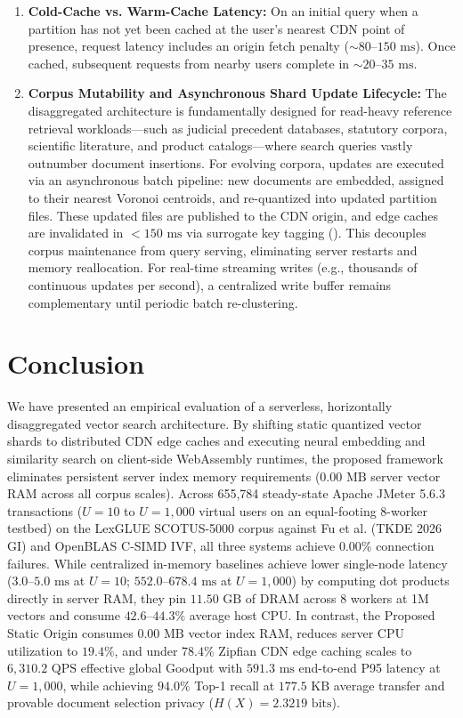 \documentclass[11pt,journal,compsoc,onecolumn]{IEEEtran}
\begin{document}
\begin{enumerate}
    \item \textbf{Cold-Cache vs. Warm-Cache Latency:} On an initial query when a partition has not yet been cached at the user's nearest CDN point of presence, request latency includes an origin fetch penalty ($\sim 80\text{--}150\text{ ms}$). Once cached, subsequent requests from nearby users complete in $\sim 20\text{--}35\text{ ms}$.
    \item \textbf{Corpus Mutability and Asynchronous Shard Update Lifecycle:} The disaggregated architecture is fundamentally designed for read-heavy reference retrieval workloads---such as judicial precedent databases, statutory corpora, scientific literature, and product catalogs---where search queries vastly outnumber document insertions. For evolving corpora, updates are executed via an asynchronous batch pipeline: new documents are embedded, assigned to their nearest Voronoi centroids, and re-quantized into updated partition files. These updated files are published to the CDN origin, and edge caches are invalidated in $<150\text{ ms}$ via surrogate key tagging (). This decouples corpus maintenance from query serving, eliminating server restarts and memory reallocation. For real-time streaming writes (e.g., thousands of continuous updates per second), a centralized write buffer remains complementary until periodic batch re-clustering.
\end{enumerate}

\clearpage

\section{Conclusion}
We have presented an empirical evaluation of a serverless, horizontally disaggregated vector search architecture. By shifting static quantized vector shards to distributed CDN edge caches and executing neural embedding and similarity search on client-side WebAssembly runtimes, the proposed framework eliminates persistent server index memory requirements ($0.00\text{ MB}$ server vector RAM across all corpus scales). Across 655,784 steady-state Apache JMeter 5.6.3 transactions ($U=10$ to $U=1,000$ virtual users on an equal-footing 8-worker testbed) on the LexGLUE SCOTUS-5000 corpus against Fu et al. (TKDE 2026 GI) and OpenBLAS C-SIMD IVF, all three systems achieve $0.00\%$ connection failures. While centralized in-memory baselines achieve lower single-node latency ($3.0\text{--}5.0\text{ ms}$ at $U=10$; $552.0\text{--}678.4\text{ ms}$ at $U=1,000$) by computing dot products directly in server RAM, they pin $11.50\text{ GB}$ of DRAM across 8 workers at 1M vectors and consume $42.6\text{--}44.3\%$ average host CPU. In contrast, the Proposed Static Origin consumes $0.00\text{ MB}$ vector index RAM, reduces server CPU utilization to $19.4\%$, and under $78.4\%$ Zipfian CDN edge caching scales to $6,310.2\text{ QPS}$ effective global Goodput with $591.3\text{ ms}$ end-to-end P95 latency at $U=1,000$, while achieving $94.0\%$ Top-1 recall at $177.5\text{ KB}$ average transfer and provable document selection privacy ($H(X) = 2.3219\text{ bits}$).



\end{document}
